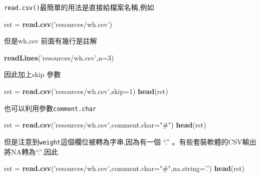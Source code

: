 \documentclass[]{book}
\newenvironment{Shaded}{\begin{snugshade}}{\end{snugshade}}
\newcommand{\KeywordTok}[1]{\textcolor[rgb]{0.13,0.29,0.53}{\textbf{#1}}}
\newcommand{\DataTypeTok}[1]{\textcolor[rgb]{0.13,0.29,0.53}{#1}}
\newcommand{\DecValTok}[1]{\textcolor[rgb]{0.00,0.00,0.81}{#1}}
\newcommand{\StringTok}[1]{\textcolor[rgb]{0.31,0.60,0.02}{#1}}
\newcommand{\NormalTok}[1]{#1}
\theoremstyle{definition}
\theoremstyle{definition}
\theoremstyle{definition}
\theoremstyle{remark}
\begin{document}
\texttt{read.csv()}最簡單的用法是直接給檔案名稱,例如

\begin{Shaded}
\begin{Highlighting}[]
\NormalTok{rst =}\StringTok{ }\KeywordTok{read.csv}\NormalTok{(}\StringTok{'resources/wh.csv'}\NormalTok{)}
\end{Highlighting}
\end{Shaded}

但是wh.csv 前面有幾行是註解

\begin{Shaded}
\begin{Highlighting}[]
\KeywordTok{readLines}\NormalTok{(}\StringTok{'resources/wh.csv'}\NormalTok{,}\DataTypeTok{n=}\DecValTok{3}\NormalTok{)}
\end{Highlighting}
\end{Shaded}

因此加上skip 參數

\begin{Shaded}
\begin{Highlighting}[]
\NormalTok{rst =}\StringTok{ }\KeywordTok{read.csv}\NormalTok{(}\StringTok{'resources/wh.csv'}\NormalTok{,}\DataTypeTok{skip=}\DecValTok{1}\NormalTok{)}
\KeywordTok{head}\NormalTok{(rst)}
\end{Highlighting}
\end{Shaded}

也可以利用參數\texttt{comment.char}

\begin{Shaded}
\begin{Highlighting}[]
\NormalTok{rst =}\StringTok{ }\KeywordTok{read.csv}\NormalTok{(}\StringTok{'resources/wh.csv'}\NormalTok{,}\DataTypeTok{comment.char=}\StringTok{"#"}\NormalTok{)}
\KeywordTok{head}\NormalTok{(rst)}
\end{Highlighting}
\end{Shaded}

但是注意到\texttt{weight}這個欄位被轉為字串,因為有一個 ``.''
。有些套裝軟體的CSV輸出將NA轉為``.'',因此

\begin{Shaded}
\begin{Highlighting}[]
\NormalTok{rst =}\StringTok{ }\KeywordTok{read.csv}\NormalTok{(}\StringTok{'resources/wh.csv'}\NormalTok{,}\DataTypeTok{comment.char=}\StringTok{"#"}\NormalTok{,}\DataTypeTok{na.string=}\StringTok{'.'}\NormalTok{)}
\KeywordTok{head}\NormalTok{(rst)}
\end{Highlighting}
\end{Shaded}
\end{document}
